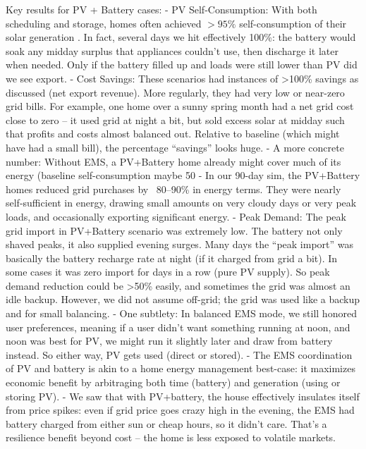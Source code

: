 \documentclass[12pt,a4paper]{article}
\begin{document}
Key results for PV + Battery cases:
- PV Self-Consumption: With both scheduling and storage, homes often achieved $>95\%$ self-consumption of their solar generation \cite{Yoshida2018}. In fact, several days we hit effectively 100\%: the battery would soak any midday surplus that appliances couldn't use, then discharge it later when needed. Only if the battery filled up and loads were still lower than PV did we see export.
- Cost Savings: These scenarios had instances of >100\% savings as discussed (net export revenue). More regularly, they had very low or near-zero grid bills. For example, one home over a sunny spring month had a net grid cost close to zero – it used grid at night a bit, but sold excess solar at midday such that profits and costs almost balanced out. Relative to baseline (which might have had a small bill), the percentage “savings” looks huge.
- A more concrete number: Without EMS, a PV+Battery home already might cover much of its energy (baseline self-consumption maybe 50%
- In our 90-day sim, the PV+Battery homes reduced grid purchases by ~80–90\% in energy terms. They were nearly self-sufficient in energy, drawing small amounts on very cloudy days or very peak loads, and occasionally exporting significant energy.
- Peak Demand: The peak grid import in PV+Battery scenario was extremely low. The battery not only shaved peaks, it also supplied evening surges. Many days the “peak import” was basically the battery recharge rate at night (if it charged from grid a bit). In some cases it was zero import for days in a row (pure PV supply). So peak demand reduction could be >50\% easily, and sometimes the grid was almost an idle backup. However, we did not assume off-grid; the grid was used like a backup and for small balancing.
- One subtlety: In balanced EMS mode, we still honored user preferences, meaning if a user didn’t want something running at noon, and noon was best for PV, we might run it slightly later and draw from battery instead. So either way, PV gets used (direct or stored).
- The EMS coordination of PV and battery is akin to a home energy management best-case: it maximizes economic benefit by arbitraging both time (battery) and generation (using or storing PV). 
- We saw that with PV+battery, the house effectively insulates itself from price spikes: even if grid price goes crazy high in the evening, the EMS had battery charged from either sun or cheap hours, so it didn’t care. That’s a resilience benefit beyond cost – the home is less exposed to volatile markets.
\end{document}

